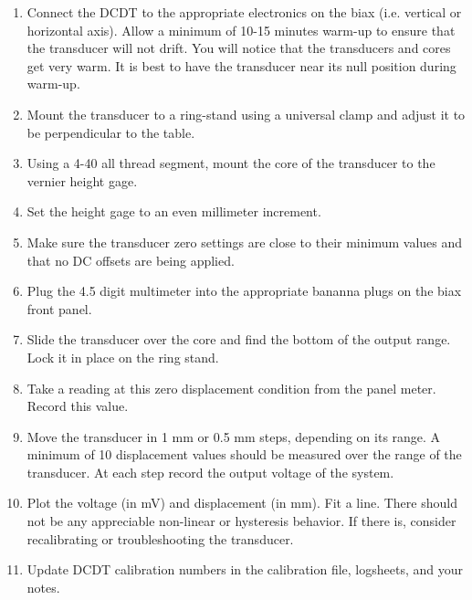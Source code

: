 \begin{enumerate}
\item Connect the DCDT to the appropriate electronics on the biax (i.e.
    vertical or horizontal axis). Allow a minimum of 10-15 minutes warm-up to
    ensure that the transducer will not drift. You will notice that the transducers
    and cores get very warm. It is best to have the transducer near its null position
    during warm-up.
    
\item Mount the transducer to a ring-stand using a universal clamp and adjust it to be perpendicular to
         the table.
         
\item Using a 4-40 all thread segment, mount the core of the transducer to the vernier height gage.

\item Set the height gage to an even millimeter increment.

\item  Make sure the transducer zero settings are close to their minimum values and that
          no DC offsets are being applied.
      
\item Plug the 4.5 digit multimeter into the appropriate bananna plugs on the
    biax front panel. 
        
\item Slide the transducer over the core and find the bottom of the output range. Lock it in place on the ring stand.
        
\item Take a reading at this zero displacement condition from the panel meter. Record this value.

\item Move the transducer in 1 mm or 0.5 mm steps, depending on its range. A minimum of 10 displacement values should
         be measured over the range of the transducer. At each step record the output voltage of the system.

\item Plot the voltage (in mV) and displacement (in mm). Fit a line. There should not
     be any appreciable non-linear or hysteresis behavior. If there is, consider
     recalibrating or troubleshooting the transducer.

\item Update DCDT calibration numbers in the calibration file, logsheets, and your notes.
\end{enumerate}


